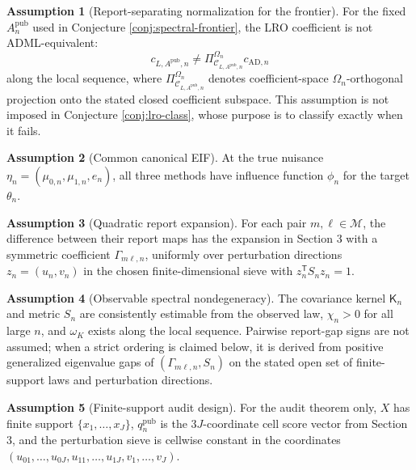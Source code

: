 \documentclass[11pt]{article}
\newcommand{\transpose}{\mathsf{T}}
\theoremstyle{definition}
\newtheorem{assumption}{Assumption}
\theoremstyle{plain}
\theoremstyle{remark}
\begin{document}
\begin{assumption}[Report-separating normalization for the frontier]\label{ass:lro-separated}
For the fixed \(A_n^{\mathrm{pub}}\) used in Conjecture
\ref{conj:spectral-frontier}, the LRO coefficient is not ADML-equivalent:
\[
c_{L,A^{\mathrm{pub}},n}\ne
\Pi_{\mathcal C_{L,A^{\mathrm{pub}},n}}^{\Omega_n}c_{\mathrm{AD},n}
\]
along the local sequence, where
\(\Pi_{\mathcal C_{L,A^{\mathrm{pub}},n}}^{\Omega_n}\) denotes coefficient-space
\(\Omega_n\)-orthogonal projection onto the stated closed coefficient
subspace.  This assumption is not imposed in Conjecture
\ref{conj:lro-class}, whose purpose is to classify exactly when it fails.
\end{assumption}

\begin{assumption}[Common canonical EIF]\label{ass:eif}
At the true nuisance \(\eta_n=(\mu_{0,n},\mu_{1,n},e_n)\), all three
methods have influence function \(\phi_n\) for the target \(\theta_n\).
\end{assumption}

\begin{assumption}[Quadratic report expansion]\label{ass:quadratic}
For each pair \(m,\ell\in\mathcal M\), the difference between their report
maps has the expansion in Section 3 with a symmetric coefficient
\(\Gamma_{m\ell,n}\), uniformly over perturbation directions \(z_n=(u_n,v_n)\)
in the chosen finite-dimensional sieve with \(z_n^{\transpose}S_nz_n=1\).
\end{assumption}

\begin{assumption}[Observable spectral nondegeneracy]\label{ass:spectral}
The covariance kernel \(\mathsf K_n\) and metric \(S_n\) are consistently estimable
from the observed law, \(\chi_n>0\) for all large \(n\), and \(\omega_K\)
exists along the local sequence.  Pairwise report-gap signs are not assumed;
when a strict ordering is claimed below, it is derived from positive
generalized eigenvalue gaps of \((\Gamma_{m\ell,n},S_n)\) on the stated open
set of finite-support laws and perturbation directions.
\end{assumption}

\begin{assumption}[Finite-support audit design]\label{ass:finite-audit}
For the audit theorem only, \(X\) has finite support
\(\{x_1,\ldots,x_J\}\), \(q^{\mathrm{pub}}_n\) is the \(3J\)-coordinate cell
score vector from Section 3, and the perturbation sieve is cellwise constant
in the coordinates
\((u_{01},\ldots,u_{0J},u_{11},\ldots,u_{1J},v_1,\ldots,v_J)\).
\end{assumption}
\end{document}
